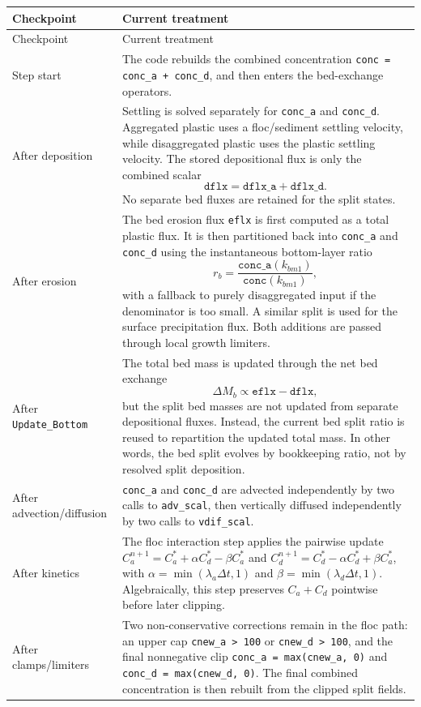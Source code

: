 \documentclass[11pt]{article}
\begin{document}
\begin{longtable}{>{\raggedright\arraybackslash}p{} >{\raggedright\arraybackslash}p{}}
\toprule
Checkpoint & Current treatment \\
\midrule
\endfirsthead
\toprule
Checkpoint & Current treatment \\
\midrule
\endhead
Step start &
The code rebuilds the combined concentration \texttt{conc = conc\_a + conc\_d}, and then enters
the bed-exchange operators. \\
After deposition &
Settling is solved separately for \texttt{conc\_a} and \texttt{conc\_d}. Aggregated plastic
uses a floc/sediment settling velocity, while disaggregated plastic uses the plastic settling
velocity. The stored depositional flux is only the combined scalar
\[
\texttt{dflx} = \texttt{dflx\_a} + \texttt{dflx\_d}.
\]
No separate bed fluxes are retained for the split states. \\
After erosion &
The bed erosion flux \texttt{eflx} is first computed as a total plastic flux. It is then
partitioned back into \texttt{conc\_a} and \texttt{conc\_d} using the instantaneous bottom-layer
ratio
\[
r_b = \frac{\texttt{conc\_a}(k_{bm1})}{\texttt{conc}(k_{bm1})},
\]
with a fallback to purely disaggregated input if the denominator is too small. A similar split
is used for the surface precipitation flux. Both additions are passed through local growth
limiters. \\
After \texttt{Update\_Bottom} &
The total bed mass is updated through the net bed exchange
\[
\Delta M_b \propto \texttt{eflx} - \texttt{dflx},
\]
but the split bed masses are not updated from separate depositional fluxes. Instead, the current
bed split ratio is reused to repartition the updated total mass. In other words, the bed split
evolves by bookkeeping ratio, not by resolved split deposition. \\
After advection/diffusion &
\texttt{conc\_a} and \texttt{conc\_d} are advected independently by two calls to
\texttt{adv\_scal}, then vertically diffused independently by two calls to
\texttt{vdif\_scal}. \\
After kinetics &
The floc interaction step applies the pairwise update
\(C_a^{n+1} = C_a^* + \alpha C_d^* - \beta C_a^*\) and
\(C_d^{n+1} = C_d^* - \alpha C_d^* + \beta C_a^*\),
with $\alpha = \min(\lambda_a \Delta t, 1)$ and $\beta = \min(\lambda_d \Delta t, 1)$.
Algebraically, this step preserves $C_a + C_d$ pointwise before later clipping. \\
After clamps/limiters &
Two non-conservative corrections remain in the floc path: an upper cap
\texttt{cnew\_a > 100} or \texttt{cnew\_d > 100}, and the final nonnegative clip
\texttt{conc\_a = max(cnew\_a, 0)} and \texttt{conc\_d = max(cnew\_d, 0)}. The final combined concentration is then rebuilt
from the clipped split fields. \\
\bottomrule
\end{longtable}
\end{document}
